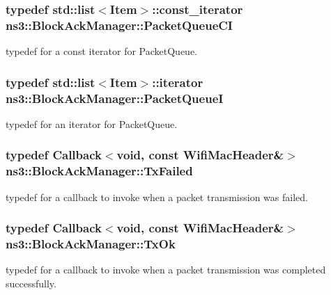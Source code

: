 \subsubsection[{\texorpdfstring{Packet\+Queue\+CI}{PacketQueueCI}}]{\setlength{\rightskip}{0pt plus 5cm}typedef {\bf std\+::list}$<${\bf Item}$>$\+::const\+\_\+iterator {\bf ns3\+::\+Block\+Ack\+Manager\+::\+Packet\+Queue\+CI}\hspace{0.3cm}{\ttfamily [private]}}\hypertarget{classns3_1_1BlockAckManager_a7d5306ccfcc49e44b7ffd190b2e190fa}{}\label{classns3_1_1BlockAckManager_a7d5306ccfcc49e44b7ffd190b2e190fa}
typedef for a const iterator for Packet\+Queue. 
\subsubsection[{\texorpdfstring{Packet\+QueueI}{PacketQueueI}}]{\setlength{\rightskip}{0pt plus 5cm}typedef {\bf std\+::list}$<${\bf Item}$>$\+::iterator {\bf ns3\+::\+Block\+Ack\+Manager\+::\+Packet\+QueueI}\hspace{0.3cm}{\ttfamily [private]}}\hypertarget{classns3_1_1BlockAckManager_a2bb94802381e70535e8a7c892fd01d48}{}\label{classns3_1_1BlockAckManager_a2bb94802381e70535e8a7c892fd01d48}
typedef for an iterator for Packet\+Queue. 
\subsubsection[{\texorpdfstring{Tx\+Failed}{TxFailed}}]{\setlength{\rightskip}{0pt plus 5cm}typedef {\bf Callback}$<$void, const {\bf Wifi\+Mac\+Header}\&$>$ {\bf ns3\+::\+Block\+Ack\+Manager\+::\+Tx\+Failed}}\hypertarget{classns3_1_1BlockAckManager_a19b8dc1978e36f011ad60a91c1c7d09c}{}\label{classns3_1_1BlockAckManager_a19b8dc1978e36f011ad60a91c1c7d09c}
typedef for a callback to invoke when a packet transmission was failed. 
\subsubsection[{\texorpdfstring{Tx\+Ok}{TxOk}}]{\setlength{\rightskip}{0pt plus 5cm}typedef {\bf Callback}$<$void, const {\bf Wifi\+Mac\+Header}\&$>$ {\bf ns3\+::\+Block\+Ack\+Manager\+::\+Tx\+Ok}}\hypertarget{classns3_1_1BlockAckManager_a982d21c899e65a7d1bdc181c8d6de2b4}{}\label{classns3_1_1BlockAckManager_a982d21c899e65a7d1bdc181c8d6de2b4}
typedef for a callback to invoke when a packet transmission was completed successfully. 

